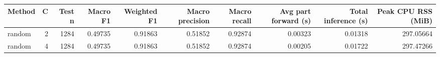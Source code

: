 \begin{tabular}{lrrrrrrrrr}
\toprule
Method & C & Test n & Macro F1 & Weighted F1 & Macro precision & Macro recall & Avg part forward (s) & Total inference (s) & Peak CPU RSS (MiB) \\
\midrule
random & 2 & 1284 & 0.49735 & 0.91863 & 0.51852 & 0.92874 & 0.00323 & 0.01318 & 297.05664 \\
random & 4 & 1284 & 0.49735 & 0.91863 & 0.51852 & 0.92874 & 0.00205 & 0.01722 & 297.47266 \\
\bottomrule
\end{tabular}
